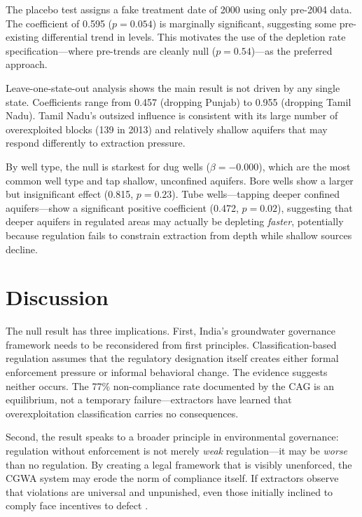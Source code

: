 \documentclass[12pt]{article}
\begin{document}
The placebo test assigns a fake treatment date of 2000 using only pre-2004 data. The coefficient of 0.595 ($p = 0.054$) is marginally significant, suggesting some pre-existing differential trend in levels. This motivates the use of the depletion rate specification---where pre-trends are cleanly null ($p = 0.54$)---as the preferred approach.

Leave-one-state-out analysis shows the main result is not driven by any single state. Coefficients range from 0.457 (dropping Punjab) to 0.955 (dropping Tamil Nadu). Tamil Nadu's outsized influence is consistent with its large number of overexploited blocks (139 in 2013) and relatively shallow aquifers that may respond differently to extraction pressure.

By well type, the null is starkest for dug wells ($\beta = -0.000$), which are the most common well type and tap shallow, unconfined aquifers. Bore wells show a larger but insignificant effect (0.815, $p = 0.23$). Tube wells---tapping deeper confined aquifers---show a significant positive coefficient (0.472, $p = 0.02$), suggesting that deeper aquifers in regulated areas may actually be depleting \textit{faster}, potentially because regulation fails to constrain extraction from depth while shallow sources decline.





\section{Discussion}

The null result has three implications. First, India's groundwater governance framework needs to be reconsidered from first principles. Classification-based regulation assumes that the regulatory designation itself creates either formal enforcement pressure or informal behavioral change. The evidence suggests neither occurs. The 77\% non-compliance rate documented by the CAG is an equilibrium, not a temporary failure---extractors have learned that overexploitation classification carries no consequences.

Second, the result speaks to a broader principle in environmental governance: regulation without enforcement is not merely \textit{weak} regulation---it may be \textit{worse} than no regulation. By creating a legal framework that is visibly unenforced, the CGWA system may erode the norm of compliance itself. If extractors observe that violations are universal and unpunished, even those initially inclined to comply face incentives to defect \citep{fisman2017corruption}.
\end{document}
